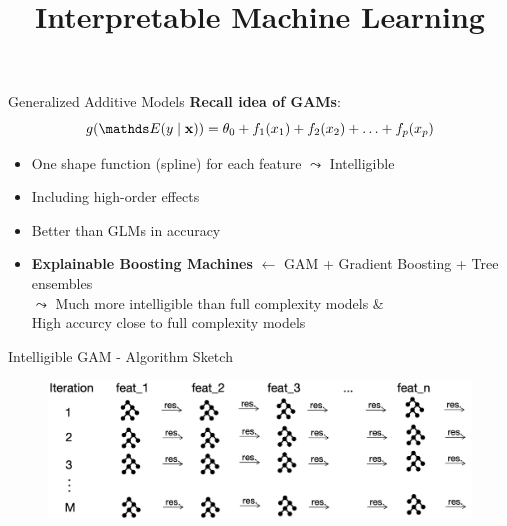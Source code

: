 \documentclass[11pt,compress,t,notes=noshow, aspectratio=169, xcolor=table]{beamer}
\title{Interpretable Machine Learning}
\date{}
\begin{document}
\newcommand{\titlefigure}{figure/ebm.jpg}
\newcommand{\learninggoals}{
\item Motivation from GAM
\item Intelligible GAM
\item Accurate GAM + Pairwise Interactions}


\begin{frame}{Generalized Additive Models}
\textbf{Recall idea of GAMs}: $$g(\E (y \mid \xv)) = \theta_0 + f_1(x_1) + f_2(x_2) + \ldots + f_p(x_p)$$
\begin{itemize}
    \item One shape function (spline) for each feature $\leadsto$ Intelligible    
    \item Including high-order effects
    \item Better than GLMs in accuracy
    \item \textbf{Explainable Boosting Machines} $\leftarrow$ GAM + Gradient Boosting + Tree ensembles\\$\leadsto$ Much more intelligible than full complexity models \&\\ \:\:\:\:\:\:High accurcy close to full complexity models
\end{itemize}
\end{frame}

\begin{frame}{Intelligible GAM - Algorithm Sketch}
\begin{figure}
    \centering
    \includegraphics[width=1\linewidth]{slides//02_interpretable-models//figure/ebm.png}
    \label{fig:Intelligible GAM}
\end{figure}
\end{frame}
\end{document}
